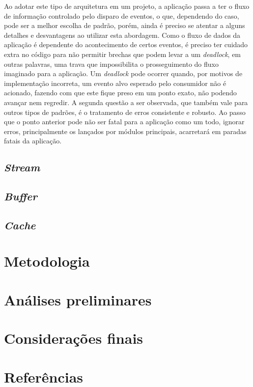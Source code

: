 \documentclass[12pt]{article}
\begin{document}
Ao adotar este tipo de arquitetura em um projeto, a aplicação passa a ter o fluxo de informação controlado pelo disparo
de eventos, o que, dependendo do caso, pode ser a melhor escolha de padrão, porém, ainda é preciso se atentar a alguns
detalhes e desvantagens ao utilizar esta abordagem. Como o fluxo de dados da aplicação é dependente do acontecimento
de certos eventos, é preciso ter cuidado extra no código para não permitir brechas que podem levar a um \textit{deadlock},
em outras palavras, uma trava que impossibilita o prosseguimento do fluxo imaginado para a aplicação. Um 
\textit{deadlock} pode ocorrer quando, por motivos de implementação incorreta, um evento alvo esperado pelo
consumidor não é acionado, fazendo com que este fique preso em um ponto exato, não podendo avançar nem regredir.
A segunda questão a ser observada, que também vale para outros tipos de padrões, é o tratamento de erros consistente
e robusto. Ao passo que o ponto anterior pode não ser fatal para a aplicação como um todo, ignorar erros, principalmente
os lançados por módulos principais, acarretará em paradas fatais da aplicação. \cite[p. 28]{DIOGORESENDE}


\subsection{\textit{Stream}}


\subsection{\textit{Buffer}}


\subsection{\textit{Cache}}


\section{Metodologia}



\section{Análises preliminares}


\section{Considerações finais}


\section{Referências}


\end{document}
